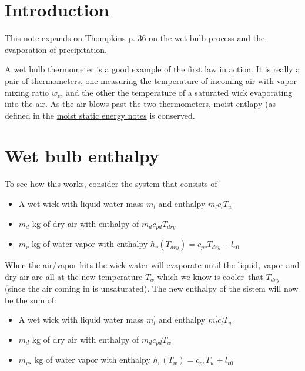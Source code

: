 \documentclass[12pt]{article}
\begin{document}
\newcommand{\vect}[1]{\boldsymbol{\vec{#1}}}
\pagestyle{first}


\section{Introduction}
\label{sec:introduction}

This note expands on Thompkins p. 36 on the wet bulb process and the evaporation of precipitation.

A wet bulb thermometer is a good example of the first law in action.
It is really a pair of thermometers, one measuring
the temperature of incoming  air with vapor mixing ratio $w_v$, and the other the temperature of a saturated
wick evaporating into the air.  As the air blows past the two thermometers,
moist entlapy (as defined in  the
\href{https://drive.google.com/file/d/1BPTvFijtktG4135T1X8DXwI8l_C8xHEt/view?usp=sharing}%
{moist static energy notes} is conserved.


\section{Wet bulb enthalpy}
\label{sec:wet-bulb-enthalpy}


To see how this works, consider the system that consists of 

\begin{itemize}
\item A wet wick with liquid water mass $m_l$ and enthalpy $m_l c_l T_{w}$
\item $m_d$ kg of dry air with enthalpy of $m_d c_{pd} T_{dry}$
\item $m_v$ kg of water vapor with enthalpy $h_v(T_{dry})=c_{pv} T_{dry} + l_{v0}$
\end{itemize}

When the air/vapor hits the wick water will evaporate until the liquid, vapor
and dry air are all at  the new temperature $T_w$ which we know is cooler\
that $T_{dry}$ (since the air coming in is unsaturated).  The new enthalpy
of the sistem will now be the sum of:


\begin{itemize}
\item A wet wick with liquid water mass $m^\prime_l$ and enthalpy $m^\prime_l c_l T_{w}$
\item $m_d$ kg of dry air with enthalpy of $m_d c_{pd} T_{w}$
\item $m_{vs}$ kg of water vapor with enthalpy $h_v(T_{w})=c_{pv} T_{w} + l_{v0}$
\end{itemize}
\end{document}
